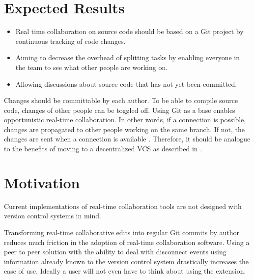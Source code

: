 \section{Expected Results}

\begin{itemize}
    \item Real time collaboration on source code should be based on a Git project by
    continuous tracking of code changes.
    \item Aiming to decrease the overhead of splitting tasks by enabling everyone in the team to see what other people are working on. 
    \item Allowing discussions about source code that has not yet been committed.
\end{itemize}

Changes should be committable by each author. To be able to compile source code, changes of other people can be toggled off.
Using Git as a base enables opportunistic real-time collaboration. In other words, if a connection is possible, changes are propagated  to other people working on the same branch. If not, the changes are sent when a connection is available \cite{6188603}. Therefore, it should be analogue to the benefits of moving to a decentralized VCS as described in \cite{AlwisSillito:2009:centralToDecentralVCS}.

\section{Motivation}

Current implementations of real-time collaboration tools are not designed with version control systems in mind.

Transforming real-time collaborative edits into regular Git commits by author reduces much friction in the adoption of real-time collaboration software. Using a peer to peer solution with the ability to deal with disconnect events using information already known to the version control system drastically increases the ease of use. Ideally a user will not even have to think about using the extension.